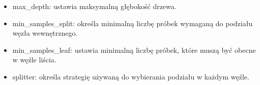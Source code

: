 \begin{itemize}
\setlength\itemsep{-0.5em}
\item max\_depth: ustawia maksymalną głębokość drzewa.
\item min\_samples\_split: określa minimalną liczbę próbek wymaganą do podziału węzła wewnętrznego.
\item min\_samples\_leaf: ustawia minimalną liczbę próbek, które muszą być obecne w węźle liścia.
\item splitter: określa strategię używaną do wybierania podziału w każdym węźle.
\end{itemize}

\noindent\makebox[\linewidth]{\rule{\paperwidth}{0.4pt}}